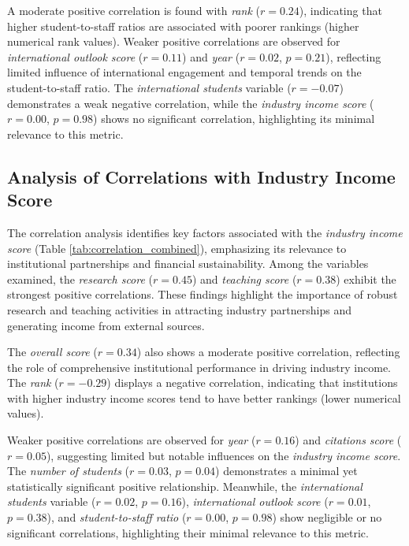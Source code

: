 \documentclass[conference]{IEEEtran}
\begin{document}
A moderate positive correlation is found with \textit{rank} ($r = 0.24$), indicating that higher student-to-staff ratios are associated with poorer rankings (higher numerical rank values). Weaker positive correlations are observed for \textit{international outlook score} ($r = 0.11$) and \textit{year} ($r = 0.02$, $p = 0.21$), reflecting limited influence of international engagement and temporal trends on the student-to-staff ratio. The \textit{international students} variable ($r = -0.07$) demonstrates a weak negative correlation, while the \textit{industry income score} ($r = 0.00$, $p = 0.98$) shows no significant correlation, highlighting its minimal relevance to this metric.



\subsection{Analysis of Correlations with Industry Income Score}

The correlation analysis identifies key factors associated with the \textit{industry income score} (Table \ref{tab:correlation_combined}), emphasizing its relevance to institutional partnerships and financial sustainability. Among the variables examined, the \textit{research score} ($r = 0.45$) and \textit{teaching score} ($r = 0.38$) exhibit the strongest positive correlations. These findings highlight the importance of robust research and teaching activities in attracting industry partnerships and generating income from external sources.

The \textit{overall score} ($r = 0.34$) also shows a moderate positive correlation, reflecting the role of comprehensive institutional performance in driving industry income. The \textit{rank} ($r = -0.29$) displays a negative correlation, indicating that institutions with higher industry income scores tend to have better rankings (lower numerical values).

Weaker positive correlations are observed for \textit{year} ($r = 0.16$) and \textit{citations score} ($r = 0.05$), suggesting limited but notable influences on the \textit{industry income score}. The \textit{number of students} ($r = 0.03$, $p = 0.04$) demonstrates a minimal yet statistically significant positive relationship. Meanwhile, the \textit{international students} variable ($r = 0.02$, $p = 0.16$), \textit{international outlook score} ($r = 0.01$, $p = 0.38$), and \textit{student-to-staff ratio} ($r = 0.00$, $p = 0.98$) show negligible or no significant correlations, highlighting their minimal relevance to this metric.
\end{document}
